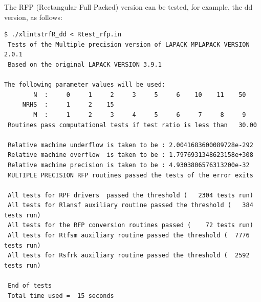 \documentclass[12pt]{article}
\begin{document}
The RFP (Rectangular Full Packed) version can be tested, for example, the dd version, as follows:
\begin{verbatim}
$ ./xlintstrfR_dd < Rtest_rfp.in
 Tests of the Multiple precision version of LAPACK MPLAPACK VERSION 2.0.1
 Based on the original LAPACK VERSION 3.9.1

The following parameter values will be used:
        N  :     0     1     2     3     5     6    10    11    50
     NRHS  :     1     2    15
        M  :     1     2     3     4     5     6     7     8     9
 Routines pass computational tests if test ratio is less than   30.00

 Relative machine underflow is taken to be : 2.0041683600089728e-292
 Relative machine overflow  is taken to be : 1.7976931348623158e+308
 Relative machine precision is taken to be : 4.9303806576313200e-32
 MULTIPLE PRECISION RFP routines passed the tests of the error exits

 All tests for RPF drivers  passed the threshold (   2304 tests run)
 All tests for Rlansf auxiliary routine passed the threshold (   384 tests run)
 All tests for the RFP conversion routines passed (    72 tests run)
 All tests for Rtfsm auxiliary routine passed the threshold (  7776 tests run)
 All tests for Rsfrk auxiliary routine passed the threshold (  2592 tests run)

 End of tests
 Total time used =  15 seconds
\end{verbatim}
\end{document}
